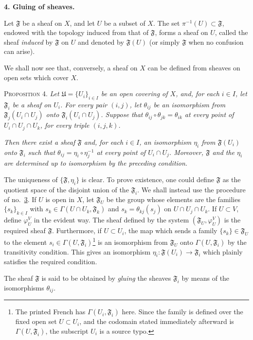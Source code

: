 
\medskip
{}\label{fac:I:1:no:4}
\textbf{4. Gluing of sheaves.}

Let $\mathfrak{F}$ be a sheaf on $X$, and let $U$ be a subset of $X$. The set $\pi^{-1}(U)\subset\mathfrak{F}$, endowed with the topology induced from that of $\mathfrak{F}$, forms a sheaf on $U$, called the sheaf \textit{induced} by $\mathfrak{F}$ on $U$ and denoted by $\mathfrak{F}(U)$ (or simply $\mathfrak{F}$ when no confusion can arise).

We shall now see that, conversely, a sheaf on $X$ can be defined from sheaves on open sets which cover $X$.

\medskip
{}\label{fac:I:1:no:4:prop:4}
\textsc{Proposition 4.} \textit{Let $\mathfrak{U}=\{U_i\}_{i\in I}$ be an open covering of $X$, and, for each $i\in I$, let $\mathfrak{F}_i$ be a sheaf on $U_i$. For every pair $(i,j)$, let $\theta_{ij}$ be an isomorphism from $\mathfrak{F}_j(U_i\cap U_j)$ onto $\mathfrak{F}_i(U_i\cap U_j)$. Suppose that $\theta_{ij}\circ\theta_{jk}=\theta_{ik}$ at every point of $U_i\cap U_j\cap U_k$, for every triple $(i,j,k)$.}

\textit{Then there exist a sheaf $\mathfrak{F}$ and, for each $i\in I$, an isomorphism $\eta_i$ from $\mathfrak{F}(U_i)$ onto $\mathfrak{F}_i$ such that $\theta_{ij}=\eta_i\circ\eta_j^{-1}$ at every point of $U_i\cap U_j$. Moreover, $\mathfrak{F}$ and the $\eta_i$ are determined up to isomorphism by the preceding condition.}

The uniqueness of $\{\mathfrak{F},\eta_i\}$ is clear. To prove existence, one could define $\mathfrak{F}$ as the quotient space of the disjoint union of the $\mathfrak{F}_i$. We shall instead use the procedure of no.~\hyperref[fac:I:1:no:3]{3}. If $U$ is open in $X$, let $\mathfrak{F}_U$ be the group whose elements are the families $\{s_k\}_{k\in I}$ with $s_k\in\Gamma(U\cap U_k,\mathfrak{F}_k)$ and $s_k=\theta_{kj}(s_j)$ on $U\cap U_j\cap U_k$. If $U\subset V$, define $\varphi_U^V$ in the evident way. The sheaf defined by the system $(\mathfrak{F}_U,\varphi_U^V)$ is the required sheaf $\mathfrak{F}$. Furthermore, if $U\subset U_i$, the map which sends a family $\{s_k\}\in\mathfrak{F}_U$ to the element $s_i\in\Gamma(U,\mathfrak{F}_i)$\footnote{The printed French has $\Gamma(U_i,\mathfrak{F}_i)$ here. Since the family is defined over the fixed open set $U\subset U_i$, and the codomain stated immediately afterward is $\Gamma(U,\mathfrak{F}_i)$, the subscript $U_i$ is a source typo.} is an isomorphism from $\mathfrak{F}_U$ onto $\Gamma(U,\mathfrak{F}_i)$ by the transitivity condition. This gives an isomorphism $\eta_i:\mathfrak{F}(U_i)\to\mathfrak{F}_i$ which plainly satisfies the required condition.

The sheaf $\mathfrak{F}$ is said to be obtained by \textit{gluing} the sheaves $\mathfrak{F}_i$ by means of the isomorphisms $\theta_{ij}$.
